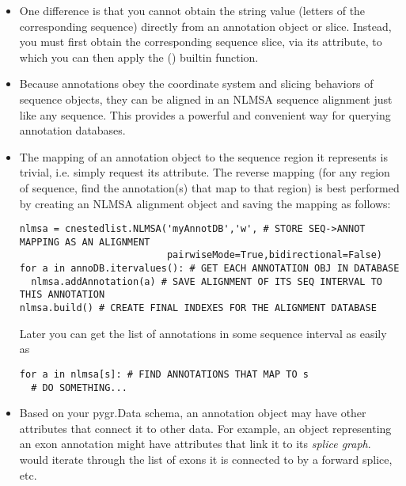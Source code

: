\documentclass{howto}
\begin{document}
\begin{itemize}
\item One difference is that you cannot obtain the string value
(letters of the corresponding sequence) directly from an annotation
object or slice.  Instead, you must first obtain the corresponding
sequence slice, via its  attribute, to which
you can then apply the () builtin function.

\item Because annotations obey the
coordinate system and slicing behaviors of sequence objects,
they can be aligned in an NLMSA sequence alignment just like any
sequence.  This provides a powerful and convenient way for
querying annotation databases.

\item The mapping of an annotation object to the sequence region it
represents is trivial, i.e. simply request its  attribute.
The reverse mapping (for any region of sequence, find the annotation(s) 
that map to that region) is best performed by creating an NLMSA alignment
object and saving the mapping as follows:
\begin{verbatim}
nlmsa = cnestedlist.NLMSA('myAnnotDB','w', # STORE SEQ->ANNOT MAPPING AS AN ALIGNMENT
                          pairwiseMode=True,bidirectional=False)
for a in annoDB.itervalues(): # GET EACH ANNOTATION OBJ IN DATABASE
  nlmsa.addAnnotation(a) # SAVE ALIGNMENT OF ITS SEQ INTERVAL TO THIS ANNOTATION
nlmsa.build() # CREATE FINAL INDEXES FOR THE ALIGNMENT DATABASE
\end{verbatim}
Later you can get the list of annotations in some sequence interval 
as easily as 
\begin{verbatim}
for a in nlmsa[s]: # FIND ANNOTATIONS THAT MAP TO s
  # DO SOMETHING...
\end{verbatim}

\item Based on your pygr.Data schema, an annotation object may
have other attributes that connect it to other data.
For example, an object  representing an exon annotation
might have attributes that link it
to its {\em splice graph}.   would iterate
through the list of exons it is connected to by a forward splice, etc.

\end{itemize}
\end{document}
